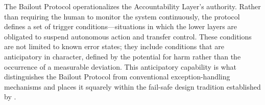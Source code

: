 The Bailout Protocol operationalizes the Accountability Layer's authority. Rather than requiring the human to monitor the system continuously, the protocol defines a set of trigger conditions---situations in which the lower layers are obligated to suspend autonomous action and transfer control. These conditions are not limited to known error states; they include conditions that are anticipatory in character, defined by the potential for harm rather than the occurrence of a measurable deviation. This anticipatory capability is what distinguishes the Bailout Protocol from conventional exception-handling mechanisms and places it squarely within the fail-safe design tradition established by \cite{tristr81}.
